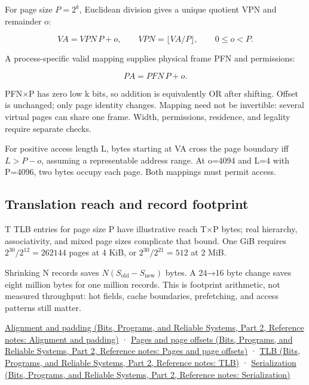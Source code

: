 \hypertarget{03-visual-computing-i-ch018-page-decomposition-and-offset-preservation}{}

For page size \(P=2^k\), Euclidean division gives a unique quotient VPN and remainder o:

\[
VA=VPN\,P+o,\qquad VPN=\lfloor VA/P\rfloor,\qquad 0\le o<P.
\]

A process-specific valid mapping supplies physical frame PFN and permissions:

\[
PA=PFN\,P+o.
\]

PFN×P has zero low k bits, so addition is equivalently OR after shifting. Offset is unchanged; only page identity changes. Mapping need not be invertible: several virtual pages can share one frame. Width, permissions, residence, and legality require separate checks.

For positive access length L, bytes starting at VA cross the page boundary iff \(L>P-o\), assuming a representable address range. At o=4094 and L=4 with P=4096, two bytes occupy each page. Both mappings must permit access.

\subsection{Translation reach and record footprint}\label{03-visual-computing-i-ch018-translation-reach-and-record-footprint}

\hypertarget{03-visual-computing-i-ch018-translation-reach-and-record-footprint}{}

T TLB entries for page size P have illustrative reach T×P bytes; real hierarchy, associativity, and mixed page sizes complicate that bound. One GiB requires \(2^{30}/2^{12}=262144\) pages at 4 KiB, or \(2^{30}/2^{21}=512\) at 2 MiB.

Shrinking N records saves \(N(S_{\mathrm{old}}-S_{\mathrm{new}})\) bytes. A 24→16 byte change saves eight million bytes for one million records. This is footprint arithmetic, not measured throughput: hot fields, cache boundaries, prefetching, and access patterns still matter.

\href{../01-Bits-Programs-and-Reliable-Systems-P02/main.pdf\#appendix-a1f7c53b4742}{Alignment and padding (Bits, Programs, and Reliable Systems, Part 2, Reference notes: Alignment and padding)} · \href{../01-Bits-Programs-and-Reliable-Systems-P02/main.pdf\#appendix-0c67cd5bf30a}{Pages and page offsets (Bits, Programs, and Reliable Systems, Part 2, Reference notes: Pages and page offsets)} · \href{../01-Bits-Programs-and-Reliable-Systems-P02/main.pdf\#appendix-7a2d9c5ce511}{TLB (Bits, Programs, and Reliable Systems, Part 2, Reference notes: TLB)} · \href{../01-Bits-Programs-and-Reliable-Systems-P02/main.pdf\#appendix-91d09ebed979}{Serialization (Bits, Programs, and Reliable Systems, Part 2, Reference notes: Serialization)}

